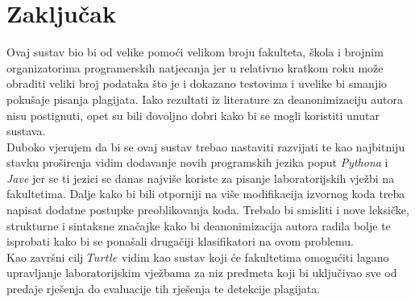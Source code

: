 \chapter*{Zaključak}

	Ovaj sustav bio bi od velike pomoći velikom broju fakulteta, škola i brojnim organizatorima programerskih natjecanja jer u relativno kratkom roku može obraditi veliki broj podataka što je i dokazano testovima i uvelike bi smanjio pokušaje pisanja plagijata. Iako rezultati iz literature za deanonimizaciju autora nisu postignuti, opet su bili dovoljno dobri kako bi se mogli koristiti unutar sustava. \\
	
	Duboko vjerujem da bi se ovaj sustav trebao nastaviti razvijati te kao najbitniju stavku proširenja vidim dodavanje novih programskih jezika poput \textit{Pythona} i \textit{Jave} jer se ti jezici se danas najviše koriste za pisanje laboratorijskih vježbi na fakultetima. Dalje kako bi bili otporniji na više modifikacija izvornog koda treba napisat dodatne postupke preoblikovanja koda. Trebalo bi smisliti i nove leksičke, strukturne i sintaksne značajke kako bi deanonimizacija autora radila bolje te isprobati kako bi se ponašali drugačiji klasifikatori na ovom problemu.  \\
	
	Kao završni cilj $Turtle$ vidim kao sustav koji će fakultetima omogućiti lagano upravljanje laboratorijskim vježbama za niz predmeta koji bi uključivao sve od predaje rješenja do evaluacije tih rješenja te detekcije plagijata. 
